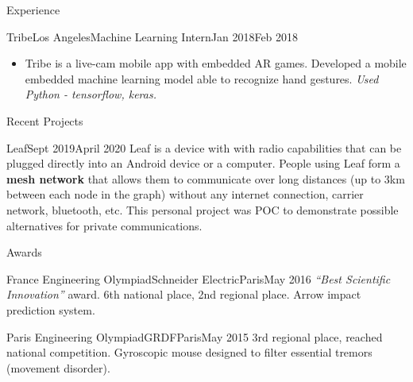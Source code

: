 \documentclass{resume}
\begin{document}
\begin{rSection}{Experience}
		\begin{job}{Tribe}{Los Angeles}{Machine Learning Intern}{Jan 2018}{Feb 2018}{
            \begin{itemize}
                \item Tribe is a live-cam mobile app with embedded AR games. Developed a mobile embedded machine learning model able to recognize hand gestures. \em{Used Python - tensorflow, keras.}
            \end{itemize}
		}
		\end{job}
	\end{rSection}

    \begin{rSection}{Recent Projects}
        \begin{project}{Leaf}{Sept 2019}{April 2020}{
            Leaf is a device with with radio capabilities that can be plugged directly into an Android device or a computer. People using Leaf form a \textbf{mesh network} that allows them to communicate over long distances (up to 3km between each node in the graph) without any internet connection, carrier network, bluetooth, etc. This personal project was POC to demonstrate possible alternatives for private communications.
        }
        \end{project}
    \end{rSection}

	\begin{rSection}{Awards} \itemsep -2pt
		\begin{award}{France Engineering Olympiad}{Schneider Electric}{Paris}{May 2016}{
				{\em \textquotedblleft Best Scientific Innovation\textquotedblright} award. 6th national place, 2nd regional place. Arrow impact prediction system.
			}
		\end{award}

		\begin{award}{Paris Engineering Olympiad}{GRDF}{Paris}{May 2015}{
				3rd regional place, reached national competition. Gyroscopic mouse designed to filter essential tremors (movement disorder).
			}
		\end{award}
	\end{rSection}
\end{document}
